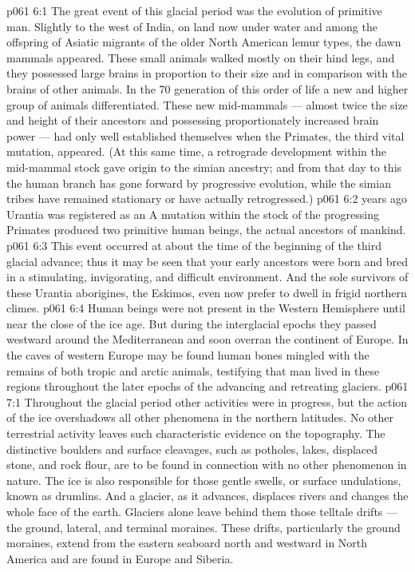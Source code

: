 \vs p061 6:1 The great event of this glacial period was the evolution of primitive man. Slightly to the west of India, on land now under water and among the offspring of Asiatic migrants of the older North American lemur types, the dawn mammals  appeared. These small animals walked mostly on their hind legs, and they possessed large brains in proportion to their size and in comparison with the brains of other animals. In the 70 generation of this order of life a new and higher group of animals  differentiated. These new mid\hyp{}mammals --- almost twice the size and height of their ancestors and possessing proportionately increased brain power --- had only well established themselves when the Primates, the third vital mutation,  appeared. (At this same time, a retrograde development within the mid\hyp{}mammal stock gave origin to the simian ancestry; and from that day to this the human branch has gone forward by progressive evolution, while the simian tribes have remained stationary or have actually retrogressed.)
\vs p061 6:2 \pc {} years ago Urantia was registered as an  A mutation within the stock of the progressing Primates  produced two primitive human beings, the actual ancestors of mankind.
\vs p061 6:3 This event occurred at about the time of the beginning of the third glacial advance; thus it may be seen that your early ancestors were born and bred in a stimulating, invigorating, and difficult environment. And the sole survivors of these Urantia aborigines, the Eskimos, even now prefer to dwell in frigid northern climes.
\vs p061 6:4 \pc Human beings were not present in the Western Hemisphere until near the close of the ice age. But during the interglacial epochs they passed westward around the Mediterranean and soon overran the continent of Europe. In the caves of western Europe may be found human bones mingled with the remains of both tropic and arctic animals, testifying that man lived in these regions throughout the later epochs of the advancing and retreating glaciers.
\vs p061 7:1 Throughout the glacial period other activities were in progress, but the action of the ice overshadows all other phenomena in the northern latitudes. No other terrestrial activity leaves such characteristic evidence on the topography. The distinctive boulders and surface cleavages, such as potholes, lakes, displaced stone, and rock flour, are to be found in connection with no other phenomenon in nature. The ice is also responsible for those gentle swells, or surface undulations, known as drumlins. And a glacier, as it advances, displaces rivers and changes the whole face of the earth. Glaciers alone leave behind them those telltale drifts --- the ground, lateral, and terminal moraines. These drifts, particularly the ground moraines, extend from the eastern seaboard north and westward in North America and are found in Europe and Siberia.
